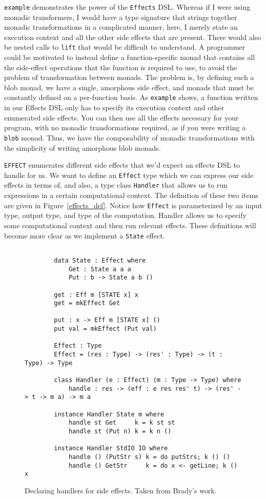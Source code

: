 \texttt{example} demonstrates the power of the \texttt{Effects} DSL. Whereas if
I were using monadic transformers, I would have a type signature that strings
together monadic transformations in a complicated manner, here, I merely state
an execution context and all the other side effects that are present. There
would also be nested calls to \texttt{lift} that would be difficult to
understand. A programmer could be motivated to instead define a
function-specific monad that contains all the side-effect operations that the
function is required to use, to avoid the problem of transformation between
monads. The problem is, by defining such a blob monad, we have a single,
amorphous side effect, and monads that must be constantly defined on a
per-function basis. As \texttt{example} shows, a function written in our Effects
DSL only has to specify its execution context and other enumerated side effects.
You can then use all the effects necessary for your program, with no monadic
transformations required, as if you were writing a \texttt{blob} monad. Thus, we
have the composability of monadic transformations with the simplicity of writing
amorphous blob monads. 

\texttt{EFFECT} enumerates different side effects that we'd expect an effects
DSL to handle for us. We want to define an \texttt{Effect} type which we can
express our side effects in terms of, and also, a type class \texttt{Handler}
that allows us to run expressions in a certain computational context. The
definition of these two items are given in Figure~\ref{effects_def}. Notice how
\texttt{Effect} is parameterized by an input type, output type, and type of the
computation. Handler allows us to specify some computational context and then
run relevant effects. These definitions will become more clear as we implement
a \texttt{State} effect. 

\begin{figure}[ht!!!!]
    \caption{Declaring handlers for side effects. Taken from Brady's work.
    \protect\cite{algebraic}}
    \label{handlers}
    \begin{lstlisting}

        data State : Effect where
            Get : State a a a
            Put : b -> State a b ()

        get : Eff m [STATE x] x
        get = mkEffect Get

        put : x -> Eff m [STATE x] ()
        put val = mkEffect (Put val)

        Effect : Type
        Effect = (res : Type) -> (res' : Type) -> (t : Type) -> Type

        class Handler (e : Effect) (m : Type -> Type) where
            handle : res -> (eff : e res res' t) -> (res' -> t -> m a) -> m a
        
        instance Handler State m where
            handle st Get     k = k st st
            handle st (Put n) k = k n ()
        
        instance Handler StdIO IO where
            handle () (PutStr s) k = do putStrs; k () ()
            handle () GetStr     k = do x <- getLine; k () x
    \end{lstlisting}
\end{figure}

